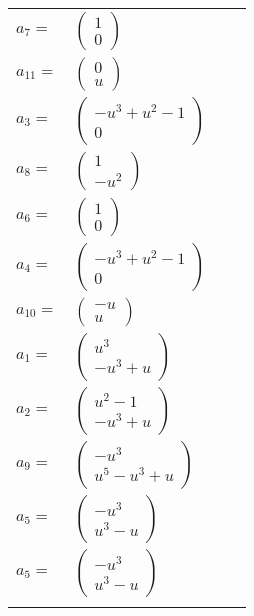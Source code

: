 \documentclass[1p]{elsarticle_modified}
\theoremstyle{definition}
\begin{document}
\begin{tabular}{m{7pt} m{180pt} m{7pt} m{180pt} }
\flushright $a_{7}=$&$\begin{pmatrix}1\\0\end{pmatrix}$ \\
\flushright $a_{11}=$&$\begin{pmatrix}0\\u\end{pmatrix}$ \\
\flushright $a_{3}=$&$\begin{pmatrix}- u^3+u^2-1\\0\end{pmatrix}$ \\
\flushright $a_{8}=$&$\begin{pmatrix}1\\- u^2\end{pmatrix}$ \\
\flushright $a_{6}=$&$\begin{pmatrix}1\\0\end{pmatrix}$ \\
\flushright $a_{4}=$&$\begin{pmatrix}- u^3+u^2-1\\0\end{pmatrix}$ \\
\flushright $a_{10}=$&$\begin{pmatrix}- u\\u\end{pmatrix}$ \\
\flushright $a_{1}=$&$\begin{pmatrix}u^3\\- u^3+u\end{pmatrix}$ \\
\flushright $a_{2}=$&$\begin{pmatrix}u^2-1\\- u^3+u\end{pmatrix}$ \\
\flushright $a_{9}=$&$\begin{pmatrix}- u^3\\u^5- u^3+u\end{pmatrix}$ \\
\flushright $a_{5}=$&$\begin{pmatrix}- u^3\\u^3- u\end{pmatrix}$\\ \flushright $a_{5}=$&$\begin{pmatrix}- u^3\\u^3- u\end{pmatrix}$\\&\end{tabular}
\end{document}
